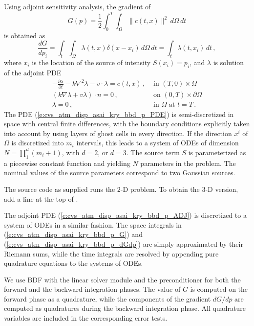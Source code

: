 Using adjoint sensitivity analysis, the gradient of
\begin{equation}\label{e:cvs_atm_disp_asai_kry_bbd_p_G}
  G(p) = \frac{1}{2} \int_0^T \int_\Omega \| c(t,x) \|^2 \, d\Omega \, dt
\end{equation}
is obtained as
\begin{equation}\label{e:cvs_atm_disp_asai_kry_bbd_p_dGdp}
  \frac{dG}{dp_i} = \int_t \int_\Omega \lambda(t,x) \delta(x-x_i) \, d\Omega \, dt
  = \int_t \lambda(t,x_i) \, dt \, ,
\end{equation}
where $x_i$ is the location of the source of intensity $S(x_i)=p_i$, and $\lambda$
is solution of the adjoint PDE
\begin{equation}\label{e:cvs_atm_disp_asai_kry_bbd_p_ADJ}
  \begin{split}
    - \frac{\partial\lambda}{\partial t} - k \nabla^2\lambda - v \cdot \lambda = c(t,x)  \, ,
    &\text{ in } (T,0) \times \Omega \\
    (k \nabla\lambda + v \lambda) \cdot n = 0 \, ,
    &\text{ on } (0,T) \times \partial\Omega \\
    \lambda = 0 \, ,
    &\text{ in } \Omega \text{ at } t = T \, .
  \end{split}
\end{equation}
The PDE (\ref{e:cvs_atm_disp_asai_kry_bbd_p_PDE}) is semi-discretized in space with 
central finite differences, with the boundary conditions explicitly taken into account 
by using layers of ghost cells in every direction. If the direction $x^i$ of $\Omega$
is discretized into $m_i$ intervals, this leads to a system of ODEs of dimension 
$N = \prod_1^d (m_i+1)$, with $d=2$, or $d=3$.
The source term $S$ is parameterized as a piecewise constant function and yielding
$N$ parameters in the problem. The nominal values of the source parameters correspond
to two Gaussian sources.

The source code as supplied runs the 2-D problem.  To obtain the 3-D version,
add a line  at the top of .

The adjoint PDE (\ref{e:cvs_atm_disp_asai_kry_bbd_p_ADJ}) is discretized to a system of
ODEs in a similar fashion.  The space integrals in (\ref{e:cvs_atm_disp_asai_kry_bbd_p_G})
and (\ref{e:cvs_atm_disp_asai_kry_bbd_p_dGdp}) are simply approximated by their
Riemann sums, while the time integrals are resolved by appending pure quadrature
equations to the systems of ODEs.

We use BDF with the {\sunlinsolspgmr} linear solver module and the
{\cvbbdpre} preconditioner for both the forward and the backward
integration phases. The value of $G$ is computed on the forward phase
as a quadrature, while the components of the gradient $dG/dp$ are
computed as quadratures during the backward integration phase.  All
quadrature variables are included in the corresponding error tests.

